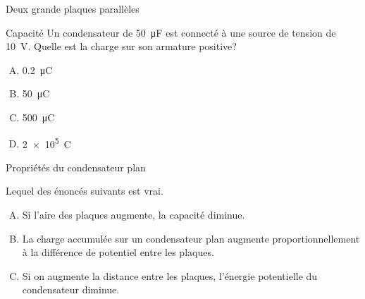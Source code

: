 \documentclass{beamer}
\begin{document}
\begin{frame}[t]{Deux grande plaques parallèles}

\end{frame}


\begin{frame}{Capacité}
  Un condensateur de \SI{50}{\micro\farad} est connecté à une source de tension
  de \SI{10}{\volt}. Quelle est la charge sur son armature positive?

  \begin{enumerate}[A.]
    \item \SI{0.2}{\micro\coulomb}
    \item \SI{50}{\micro\coulomb}
    \item<alert@2> \SI{500}{\micro\coulomb}
    \item \SI{2e5}{\coulomb}
  \end{enumerate}
\end{frame}

\begin{frame}[t]{Propriétés du condensateur plan}

Lequel des énoncés suivants est vrai.

\begin{enumerate}[A.]
  \item Si l'aire des plaques augmente, la capacité diminue.
  \item<alert@2> La charge accumulée sur un condensateur plan augmente
    proportionnellement à la différence de potentiel entre les plaques.
  \item Si on augmente la distance entre les plaques, l'énergie potentielle du
    condensateur diminue.
\end{enumerate}
\end{frame}
\end{document}
